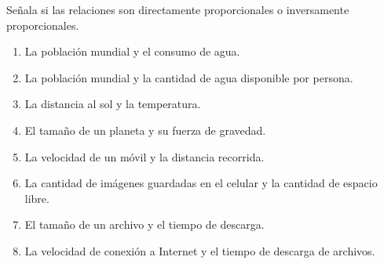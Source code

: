 \documentclass[11pt]{book}
\newenvironment{questions}[1][]{\enumerate[,#1]}{\endenumerate}
\newcommand{\choice}{\item}
\begin{document}
\begin{questions}

  \question[10] Señala si las relaciones son directamente proporcionales o inversamente proporcionales.
  \renewcommand{\labelenumi}{\Alph{enumii}}
  \begin{enumerate}
    \item La población mundial y el consumo de agua.\\
    \item  La población mundial y la cantidad de agua disponible por persona.\\
    \item La distancia al sol y la temperatura.\\
    \item  El tamaño de un planeta y su fuerza de gravedad.\\
    \item  La velocidad de un móvil y la distancia recorrida.\\
    \item La cantidad de imágenes guardadas en el celular y la cantidad de espacio libre.\\
    \item  El tamaño de un archivo y el tiempo de descarga.\\
    \item La velocidad de conexión a Internet y el tiempo de descarga de archivos.\\
  \end{enumerate}
\end{questions}
\end{document}
